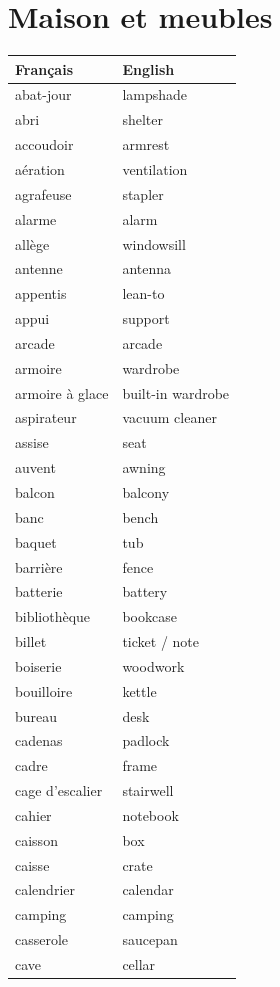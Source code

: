 \documentclass[12pt,a4paper]{article}
\begin{document}
\newpage

\section{Maison et meubles}
\begin{longtable}{p{4cm} p{6cm}}
\toprule
\textbf{Français} & \textbf{English} \\
\midrule
abat-jour & lampshade \\
abri & shelter \\
accoudoir & armrest \\
aération & ventilation \\
agrafeuse & stapler \\
alarme & alarm \\
allège & windowsill \\
antenne & antenna \\
appentis & lean-to \\
appui & support \\
arcade & arcade \\
armoire & wardrobe \\
armoire à glace & built-in wardrobe \\
aspirateur & vacuum cleaner \\
assise & seat \\
auvent & awning \\
balcon & balcony \\
banc & bench \\
baquet & tub \\
barrière & fence \\
batterie & battery \\
bibliothèque & bookcase \\
billet & ticket / note \\
boiserie & woodwork \\
bouilloire & kettle \\
bureau & desk \\
cadenas & padlock \\
cadre & frame \\
cage d'escalier & stairwell \\
cahier & notebook \\
caisson & box \\
caisse & crate \\
calendrier & calendar \\
camping & camping \\
casserole & saucepan \\
cave & cellar \\

\end{longtable}
\end{document}
